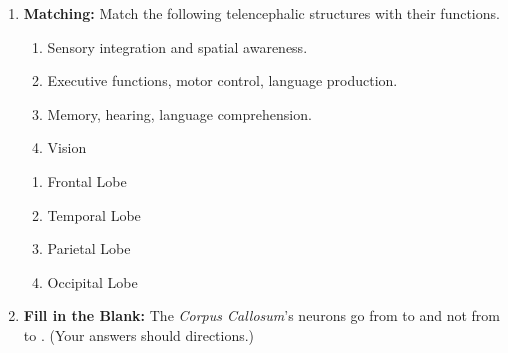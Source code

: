 \begin{enumerate}[label=\textbf{Q1.10.\arabic*}]
      \item \textbf{Matching:} Match the following telencephalic structures with their functions.
            \begin{wordbox}
                  \begin{enumerate}[label=(\roman*)]
                        \item Sensory integration and spatial awareness.
                        \item Executive functions, motor control, language production.
                        \item Memory, hearing, language comprehension.
                        \item Vision
                  \end{enumerate}
            \end{wordbox}
            \begin{enumerate}[label=(\alph*)]
                  \item Frontal Lobe \quad \dotfill \quad \underline{\hspace{3cm}}\\[0.5em]
                  \item Temporal Lobe \quad \dotfill \quad \underline{\hspace{3cm}}\\[0.5em]
                  \item Parietal Lobe \quad \dotfill \quad \underline{\hspace{3cm}}\\[0.5em]
                  \item Occipital Lobe \quad \dotfill \quad \underline{\hspace{3cm}}
            \end{enumerate}

      \item \textbf{Fill in the Blank:} The \textit{Corpus Callosum}'s neurons go from \underline{\hspace{3cm}} to \underline{\hspace{3cm}} and not from \underline{\hspace{3cm}} to \underline{\hspace{3cm}}. (Your answers should directions.) \\


\end{enumerate}
